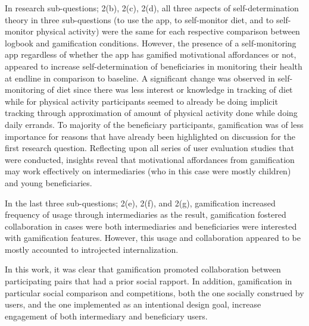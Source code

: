 In research sub-questions; 2(b), 2(c), 2(d), all three aspects of self-determination theory in three sub-questions (to use the app, to self-monitor diet, and to self-monitor physical activity) were the same for each respective comparison between logbook and gamification conditions. However, the presence of a self-monitoring app regardless of whether the app has gamified motivational affordances or not, appeared to increase self-determination of beneficiaries in monitoring their health at endline in comparison to baseline. A significant change was observed in self-monitoring of diet since there was less interest or knowledge in tracking of diet while for physical activity participants seemed to already be doing implicit tracking through approximation of amount of physical activity done while doing daily errands. To majority of the beneficiary participants, gamification was of less importance for reasons that have already been highlighted on discussion for the first research question. Reflecting upon all series of user evaluation studies that were conducted, insights reveal that motivational affordances from gamification may work effectively on intermediaries (who in this case were mostly children) and young beneficiaries. 

In the last three sub-questions; 2(e), 2(f), and 2(g), gamification increased frequency of usage through intermediaries as the result, gamification fostered collaboration in cases were both intermediaries and beneficiaries were interested with gamification features. However, this usage and collaboration appeared to be mostly accounted to introjected internalization. 

In this work, it was clear that gamification promoted collaboration between participating pairs that had a prior social rapport. In addition, gamification in particular social comparison and competitions, both the one socially construed by users, and the one implemented as an intentional design goal, increase engagement of both intermediary and beneficiary users.


